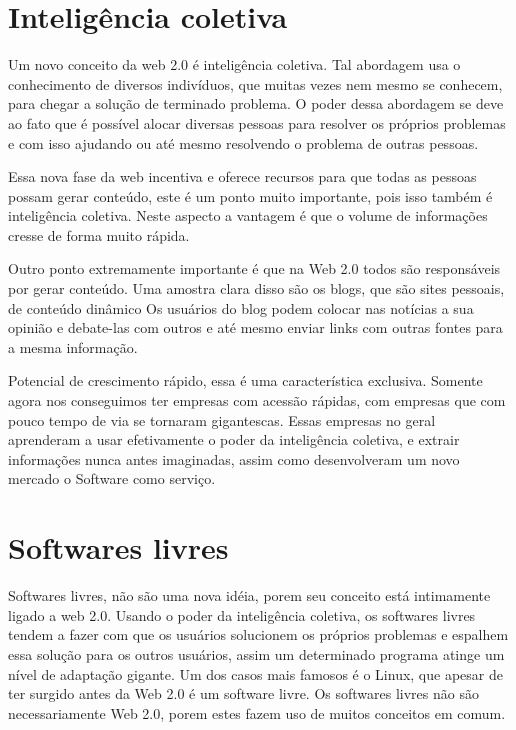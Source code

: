 \documentclass[
	12pt,				%
	openright,			%
	twoside,			%
	a4paper,			%
	Times,
	brazil,				%
	]{abntex2}
\begin{document}
\section{Inteligência coletiva}
Um novo conceito da web 2.0 é inteligência coletiva. Tal abordagem usa o conhecimento de diversos indivíduos, que muitas vezes nem mesmo se conhecem, para chegar a solução de terminado problema. O poder dessa abordagem se deve ao fato que é possível alocar diversas pessoas para resolver os próprios problemas e com isso ajudando ou até mesmo resolvendo o problema de outras pessoas\cite{web2.0}.
\par
Essa nova fase da web incentiva e oferece recursos para que todas as pessoas possam gerar conteúdo, este é um ponto muito importante, pois isso também é inteligência coletiva. Neste aspecto a vantagem é que o volume de informações cresse de forma muito rápida\cite{web2.0}.
\par
Outro ponto extremamente importante é que na Web 2.0 todos são responsáveis por gerar conteúdo. Uma amostra clara disso são os blogs, que são sites pessoais, de conteúdo dinâmico Os usuários do blog podem colocar nas notícias a sua opinião e debate-las com outros e até mesmo enviar links com outras fontes para a mesma informação\cite{web2.0}.
\par
Potencial de crescimento rápido, essa é uma característica exclusiva. Somente agora nos conseguimos ter empresas com acessão rápidas, com empresas que com pouco tempo de via se tornaram gigantescas. Essas empresas no geral aprenderam a usar efetivamente o poder da inteligência coletiva, e extrair informações nunca antes imaginadas, assim como desenvolveram um novo mercado o Software como serviço\cite{web2.0,saas}.
\par

\section{Softwares livres}
Softwares livres, não são uma nova idéia, porem seu conceito está intimamente ligado a web 2.0. Usando o poder da inteligência coletiva, os softwares livres tendem a fazer com que os usuários solucionem os próprios problemas e espalhem essa solução para os outros usuários, assim um determinado programa atinge um nível de adaptação gigante. Um dos casos mais famosos é o Linux, que apesar de ter surgido antes da Web 2.0 é um software livre. Os softwares livres não são necessariamente Web 2.0, porem estes fazem uso de muitos conceitos em comum\cite{web2.0}.
\par
\end{document}
